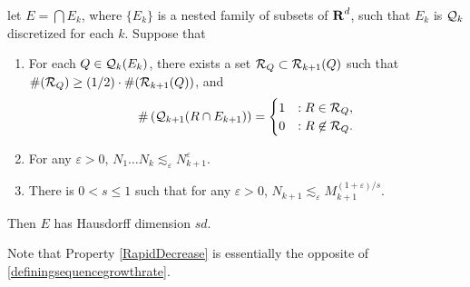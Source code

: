 \begin{theorem} \label{TheConstructionTheorem}
	let $E = \bigcap E_k$, where $\{ E_k \}$ is a nested family of subsets of $\operatorname{\mathbf{R}}^d$, such that $E_k$ is $\operatorname{\mathcal{Q}}_k$ discretized for each $k$. Suppose that 
	\begin{enumerate}
		\item \label{SingleSelection} For each $Q \in \operatorname{\mathcal{Q}}_k(E_k)$, there exists a set $\mathcal{R}_Q \subset \operatorname{\mathcal{R}}_{k+1}(Q)$ such that $\#(\mathcal{R}_Q) \geq (1/2) \cdot \#(\operatorname{\mathcal{R}}_{k+1}(Q))$, and
		\[ \# \left( \operatorname{\mathcal{Q}}_{k+1}(R \cap E_{k+1}) \right) = \begin{cases} 1 & : R \in \mathcal{R}_Q, \\ 0 & : R \not \in \mathcal{R}_Q. \end{cases} \]

		\item \label{RapidDecrease} For any $\varepsilon > 0$, $N_1 \dots N_k \lesssim_\varepsilon N_{k+1}^\varepsilon$.

		\item \label{ChangeofScales} There is $0 < s \leq 1$ such that for any $\varepsilon > 0$, $N_{k+1} \lesssim_\varepsilon M_{k+1}^{(1 + \varepsilon)/s}$.
	\end{enumerate}
	Then $E$ has Hausdorff dimension $sd$.
\end{theorem}

\begin{remark}
	Note that Property \ref{RapidDecrease} is essentially the opposite of \eqref{definingsequencegrowthrate}.
\end{remark}

